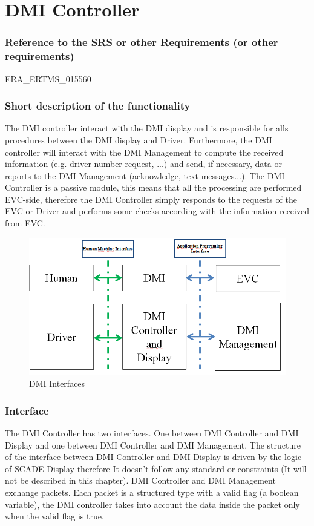 
  \section{DMI Controller}

  \subsubsection{Reference to the SRS or other Requirements (or other requirements)}

   ERA\_ERTMS\_015560

  \subsubsection{Short description of the functionality}
  The DMI controller interact with the DMI display and is responsible for alls procedures between the DMI display and Driver. Furthermore, the DMI controller will interact with the DMI Management to compute the received information (e.g. driver number request, ...) and send, if necessary, data or reports to the DMI Management (acknowledge, text messages...). The DMI Controller is a passive module, this means that all the processing are performed EVC-side, therefore the DMI Controller simply responds to the requests of the EVC or Driver and performs some checks according with the information received from EVC.

  \begin{figure}
  \centering
  \includegraphics[width=.8\textwidth]{images/DMI_Interfaces}
  \caption{DMI Interfaces}
  \end{figure}

  \subsubsection{Interface}
  The DMI Controller has two interfaces. One between DMI Controller and DMI Display and one between DMI Controller and DMI Management. 
  The structure of the interface between DMI Controller and DMI Display is driven by the logic of SCADE Display therefore It doesn't follow any standard or constraints (It will not be described in this chapter).
  DMI Controller and DMI Management exchange packets. Each packet is a structured type with a valid flag (a boolean variable), the DMI controller takes into account the data inside the packet only when the valid flag is true.

